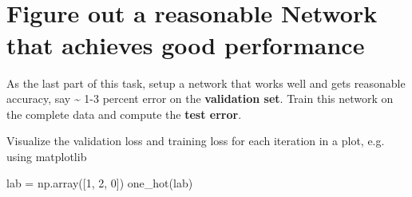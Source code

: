 \documentclass[11pt]{article}
\begin{document}
    \begin{center}
    \end{center}
    { \hspace*{\fill} \\}
    
    \begin{center}
    \end{center}
    { \hspace*{\fill} \\}
    
    \section{Figure out a reasonable Network that achieves good
performance}\label{figure-out-a-reasonable-network-that-achieves-good-performance}

As the last part of this task, setup a network that works well and gets
reasonable accuracy, say \textasciitilde{} 1-3 percent error on the
\textbf{validation set}. Train this network on the complete data and
compute the \textbf{test error}.

Visualize the validation loss and training loss for each iteration in a
plot, e.g. using matplotlib

    lab = np.array({[}1, 2, 0{]}) one\_hot(lab)

    


    
    
    
    
\end{document}

